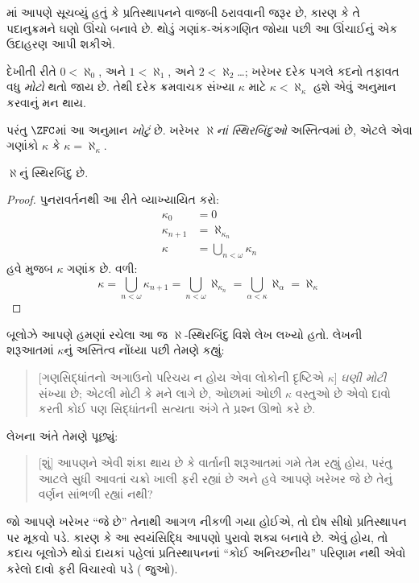 \documentclass[../../../include/open-logic-section]{subfiles}
\begin{document}

માં આપણે સૂચવ્યું હતું કે
પ્રતિસ્થાપનને વાજબી ઠરાવવાની જરૂર છે, કારણ કે તે
પદાનુક્રમને ઘણો ઊંચો બનાવે છે. થોડું ગણાંક-અંકગણિત
જોયા પછી આ ઊંચાઈનું એક ઉદાહરણ આપી શકીએ.

દેખીતી રીતે $0 < \aleph_0$, અને $1 < \aleph_1$,
અને $2 < \aleph_2$\ldots; ખરેખર દરેક પગલે કદનો
તફાવત વધુ \emph{મોટો} થતો જાય છે. તેથી દરેક
ક્રમવાચક સંખ્યા $\kappa$ માટે
$\kappa< \aleph_\kappa$ હશે એવું અનુમાન કરવાનું
મન થાય.

પરંતુ $\ZFC$માં આ અનુમાન \emph{ખોટું} છે.
ખરેખર \emph{$\aleph$નાં સ્થિરબિંદુઓ} અસ્તિત્વમાં
છે, એટલે એવા ગણાંકો $\kappa$ કે
$\kappa=\aleph_\kappa$.

\begin{prop}
$\aleph$નું સ્થિરબિંદુ છે.
\end{prop}

\begin{proof}
પુનરાવર્તનથી આ રીતે વ્યાખ્યાયિત કરો:
\begin{align*}
	\kappa_0 &= 0\\
	\kappa_{n+1} &= \aleph_{\kappa_n}\\
	\kappa&= \bigcup_{n < \omega}\kappa_n
\end{align*}
હવે 
મુજબ $\kappa$ ગણાંક છે. વળી:
\[
	\kappa= \bigcup_{n < \omega} \kappa_{n+1} = 
	\bigcup_{n < \omega}\aleph_{\kappa_n} = 
	\bigcup_{\alpha < \kappa}\aleph_\alpha = \aleph_\kappa
\]
\end{proof}

બૂલોઝે આપણે હમણાં રચેલા આ જ $\aleph$-સ્થિરબિંદુ
વિશે લેખ લખ્યો હતો. લેખની શરૂઆતમાં $\kappa$નું
અસ્તિત્વ નોંધ્યા પછી તેમણે કહ્યું:
\begin{quote}
	[ગણસિદ્ધાંતનો અગાઉનો પરિચય ન હોય એવા લોકોની
	દૃષ્ટિએ $\kappa$] \emph{ઘણી મોટી} સંખ્યા છે; એટલી
	મોટી કે મને લાગે છે, ઓછામાં ઓછી $\kappa$ વસ્તુઓ
	છે એવો દાવો કરતી કોઈ પણ સિદ્ધાંતની સત્યતા અંગે
	તે પ્રશ્ન ઊભો કરે છે.
	\citep[p.~257]{Boolos2000}
\end{quote}
લેખના અંતે તેમણે પૂછ્યું:
\begin{quote}
	[શું] આપણને એવી શંકા થાય છે કે વાર્તાની શરૂઆતમાં
	ગમે તેમ રહ્યું હોય, પરંતુ આટલે સુધી આવતાં ચક્રો
	ખાલી ફરી રહ્યાં છે અને હવે આપણે ખરેખર જે છે
	તેનું વર્ણન સાંભળી રહ્યાં નથી?
	\citep[p.~268]{Boolos2000}
\end{quote}
જો આપણે ખરેખર ``જે છે'' તેનાથી આગળ નીકળી
ગયા હોઈએ, તો દોષ સીધો પ્રતિસ્થાપન પર મૂકવો પડે.
કારણ કે આ સ્વયંસિદ્ધિ આપણો પુરાવો શક્ય બનાવે છે.
એવું હોય, તો કદાચ બૂલોઝે થોડાં દાયકાં પહેલાં
પ્રતિસ્થાપનનાં ``કોઈ અનિચ્છનીય'' પરિણામ નથી
એવો કરેલો દાવો ફરી વિચારવો પડે
( જુઓ).
\end{document}
